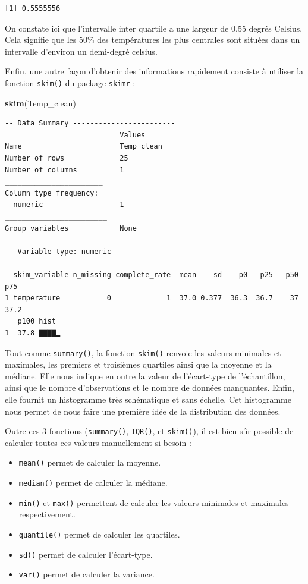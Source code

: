 \documentclass[
  a4paper,
]{article}
\newenvironment{Shaded}{\begin{snugshade}}{\end{snugshade}}
\newcommand{\KeywordTok}[1]{\textcolor[rgb]{0.12,0.11,0.11}{\textbf{#1}}}
\newcommand{\NormalTok}[1]{\textcolor[rgb]{0.12,0.11,0.11}{#1}}
\providecommand{\tightlist}{%
  \setlength{\itemsep}{0pt}\setlength{\parskip}{0pt}}
\begin{document}
\begin{verbatim}
[1] 0.5555556
\end{verbatim}

On constate ici que l'intervalle inter quartile a une largeur de 0.55 degrés Celsius. Cela signifie que les 50\% des températures les plus centrales sont situées dans un intervalle d'environ un demi-degré celsius.

Enfin, une autre façon d'obtenir des informations rapidement consiste à utiliser la fonction \texttt{skim()} du package \texttt{skimr} :

\begin{Shaded}
\begin{Highlighting}[]
\KeywordTok{skim}\NormalTok{(Temp_clean)}
\end{Highlighting}
\end{Shaded}

\begin{verbatim}
-- Data Summary ------------------------
                           Values    
Name                       Temp_clean
Number of rows             25        
Number of columns          1         
_______________________              
Column type frequency:               
  numeric                  1         
________________________             
Group variables            None      

-- Variable type: numeric ------------------------------------------------------
  skim_variable n_missing complete_rate  mean    sd    p0   p25   p50   p75
1 temperature           0             1  37.0 0.377  36.3  36.7    37  37.2
   p100 hist 
1  37.8 ▇▇▇▇▂
\end{verbatim}

Tout comme \texttt{summary()}, la fonction \texttt{skim()} renvoie les valeurs minimales et maximales, les premiers et troisièmes quartiles ainsi que la moyenne et la médiane. Elle nous indique en outre la valeur de l'écart-type de l'échantillon, ainsi que le nombre d'observations et le nombre de données manquantes. Enfin, elle fournit un histogramme très schématique et sans échelle. Cet histogramme nous permet de nous faire une première idée de la distribution des données.

Outre ces 3 fonctions (\texttt{summary()}, \texttt{IQR()}, et \texttt{skim()}), il est bien sûr possible de calculer toutes ces valeurs manuellement si besoin :

\begin{itemize}
\tightlist
\item
  \texttt{mean()} permet de calculer la moyenne.
\item
  \texttt{median()} permet de calculer la médiane.
\item
  \texttt{min()} et \texttt{max()} permettent de calculer les valeurs minimales et maximales respectivement.
\item
  \texttt{quantile()} permet de calculer les quartiles.
\item
  \texttt{sd()} permet de calculer l'écart-type.
\item
  \texttt{var()} permet de calculer la variance.
\end{itemize}
\end{document}
